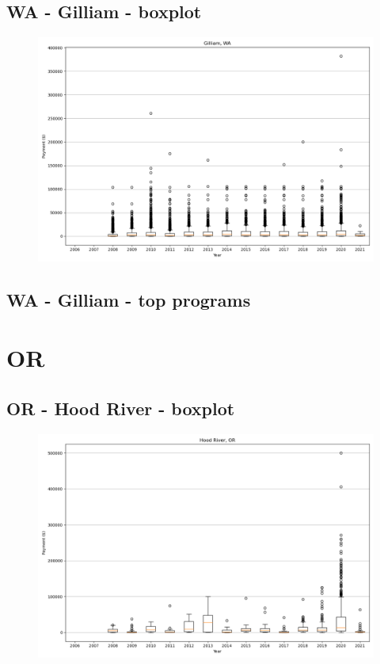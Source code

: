 \subsection*{WA - Gilliam - boxplot}
\begin{figure}[h]
\centering
\includegraphics[width=7in]{../output/boxplots/counties/Gilliam-WA_boxplot.png}
\end{figure}


\subsection*{WA - Gilliam - top programs}

\newpage
\section*{OR}
\subsection*{OR - Hood River - boxplot}
\begin{figure}[h]
\centering
\includegraphics[width=7in]{../output/boxplots/counties/Hood River-OR_boxplot.png}
\end{figure}


